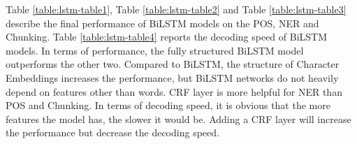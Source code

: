 Table \ref{table:lstm-table1}, Table \ref{table:lstm-table2} and Table \ref{table:lstm-table3} describe the final performance of BiLSTM models on the POS, NER and Chunking. Table \ref{table:lstm-table4} reports the decoding speed of BiLSTM models. In terms of performance, the fully structured BiLSTM model outperforms the other two. Compared to BiLSTM, the structure of Character Embeddings increases the performance, but BiLSTM networks do not heavily depend on features other than words. CRF layer is more helpful for NER than POS and Chunking. In terms of decoding speed, it is obvious that the more features the model has, the slower it would be. Adding a CRF layer will increase the performance but decrease the decoding speed. 

